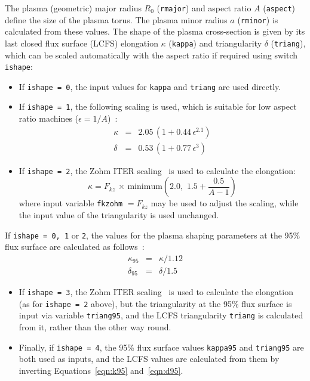 \documentclass[11pt,a4paper]{report}
\begin{document}
The plasma (geometric) major radius $R_0$ (\texttt{rmajor}) and aspect ratio
$A$ (\texttt{aspect}) define the size of the plasma torus. The plasma minor
radius $a$ (\texttt{rminor}) is calculated from these values. The shape of the
plasma cross-section is given by its last closed flux surface (LCFS) elongation
$\kappa$ (\texttt{kappa}) and triangularity $\delta$ (\texttt{triang}), which
can be scaled automatically with the aspect ratio if required using switch
\texttt{ishape}:
\begin{itemize}

\item If \texttt{ishape = 0}, the input values for \texttt{kappa} and
  \texttt{triang} are used directly.

\item If \texttt{ishape = 1}, the following scaling is used, which is suitable
  for low aspect ratio machines ($\epsilon = 1/A$)~\cite{storac}:
\begin{eqnarray}
\kappa & = & 2.05 \, (1 + 0.44 \, \epsilon^{2.1}) \\
\delta & = & 0.53 \, (1 + 0.77 \, \epsilon^3)
\end{eqnarray}

\item If \texttt{ishape = 2}, the Zohm ITER scaling~\cite{Zohm} is used to
  calculate the elongation:
\begin{equation}
\kappa = F_{kz} \, \times \, \mathrm{minimum} \left( 2.0, \, \, 1.5 + \frac{0.5}{A-1} \right)
\end{equation}
where input variable \texttt{fkzohm} $= F_{kz}$ may be used to adjust the
scaling, while the input value of the triangularity is used unchanged.

\end{itemize}
If \texttt{ishape = 0, 1} or \texttt{2}, the values for the plasma shaping
parameters at the 95\% flux surface are calculated as
follows~\cite{DEMOPhysicsGuidelines}:
\begin{eqnarray}
\kappa_{95} & = & \kappa / 1.12 \label{eqn:k95} \\
\delta_{95} & = & \delta / 1.5 \label{eqn:d95}
\end{eqnarray}
\begin{itemize}

\item If \texttt{ishape = 3}, the Zohm ITER scaling~\cite{Zohm} is used to
  calculate the elongation (as for \texttt{ishape = 2} above), but the
  triangularity at the 95\% flux surface is input via variable
  \texttt{triang95}, and the LCFS triangularity \texttt{triang} is calculated
  from it, rather than the other way round.

\item Finally, if \texttt{ishape = 4}, the 95\% flux surface values
  \texttt{kappa95} and \texttt{triang95} are both used as inputs, and the LCFS
  values are calculated from them by inverting Equations~\ref{eqn:k95} and~\ref{eqn:d95}.

\end{itemize}
\end{document}
